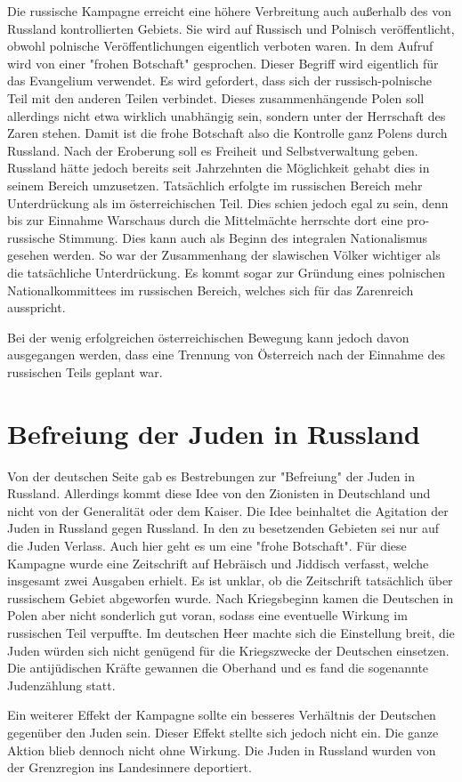 \documentclass[10pt,a4paper,oneside,ngerman,numbers=noenddot]{scrartcl}
\begin{document}
Die russische Kampagne erreicht eine höhere Verbreitung auch außerhalb des von
Russland kontrollierten Gebiets. Sie wird auf Russisch und Polnisch veröffentlicht,
obwohl polnische Veröffentlichungen eigentlich verboten waren. In dem Aufruf
wird von einer "frohen Botschaft" gesprochen. Dieser Begriff wird eigentlich
für das Evangelium verwendet. Es wird gefordert, dass sich der russisch-polnische
Teil mit den anderen Teilen verbindet. Dieses zusammenhängende Polen soll allerdings
nicht etwa wirklich unabhängig sein, sondern unter der Herrschaft des Zaren stehen.
Damit ist die frohe Botschaft also die Kontrolle ganz Polens durch Russland.
Nach der Eroberung soll es Freiheit und Selbstverwaltung geben. Russland hätte
jedoch bereits seit Jahrzehnten die Möglichkeit gehabt dies in seinem Bereich
umzusetzen. Tatsächlich erfolgte im russischen Bereich mehr Unterdrückung als
im österreichischen Teil. Dies schien jedoch egal zu sein, denn bis zur Einnahme
Warschaus durch die Mittelmächte herrschte dort eine pro-russische Stimmung.
Dies kann auch als Beginn des integralen Nationalismus gesehen werden. So war
der Zusammenhang der slawischen Völker wichtiger als die tatsächliche Unterdrückung.
Es kommt sogar zur Gründung eines polnischen Nationalkommittees im russischen
Bereich, welches sich für das Zarenreich ausspricht.

Bei der wenig erfolgreichen österreichischen Bewegung kann jedoch davon ausgegangen
werden, dass eine Trennung von Österreich nach der Einnahme des russischen Teils
geplant war.

\section*{Befreiung der Juden in Russland}

Von der deutschen Seite gab es Bestrebungen zur "Befreiung" der Juden in Russland.
Allerdings kommt diese Idee von den Zionisten in Deutschland und nicht von der
Generalität oder dem Kaiser. Die Idee beinhaltet die Agitation der Juden in
Russland gegen Russland. In den zu besetzenden Gebieten sei nur auf die Juden
Verlass. Auch hier geht es um eine "frohe Botschaft". Für diese Kampagne wurde
eine Zeitschrift auf Hebräisch und Jiddisch verfasst, welche insgesamt zwei
Ausgaben erhielt. Es ist unklar, ob die Zeitschrift tatsächlich über russischem
Gebiet abgeworfen wurde. Nach Kriegsbeginn kamen die Deutschen in Polen aber nicht
sonderlich gut voran, sodass eine eventuelle Wirkung im russischen Teil verpuffte.
Im deutschen Heer machte sich die Einstellung breit, die Juden würden sich nicht
genügend für die Kriegszwecke der Deutschen einsetzen. Die antijüdischen Kräfte
gewannen die Oberhand und es fand die sogenannte Judenzählung statt.

Ein weiterer Effekt der Kampagne sollte ein besseres Verhältnis der Deutschen
gegenüber den Juden sein. Dieser Effekt stellte sich jedoch nicht ein. Die ganze
Aktion blieb dennoch nicht ohne Wirkung. Die Juden in Russland wurden von der
Grenzregion ins Landesinnere deportiert.
\end{document}

